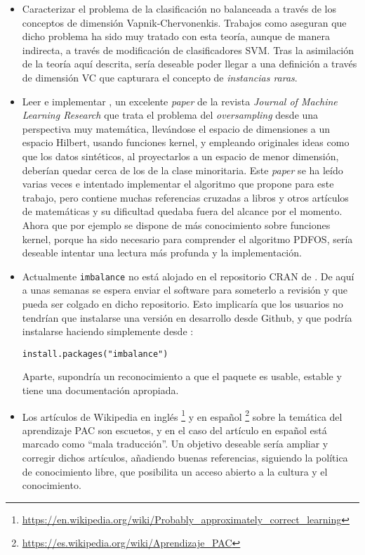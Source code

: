 \begin{itemize}
 \item Caracterizar el problema de la clasificación no balanceada a través de los conceptos de dimensión Vapnik-Chervonenkis.
  Trabajos como \citep{he2009} aseguran que dicho problema ha sido muy tratado con esta teoría, aunque de manera indirecta,
  a través de modificación de clasificadores SVM. Tras la asimilación de la teoría aquí descrita, sería deseable poder llegar
  a una definición a través de dimensión VC que capturara el concepto de \textit{instancias raras}.
  
 \item Leer e implementar \citep{pour2015}, un excelente \textit{paper} de la revista \textit{Journal of Machine Learning
  Research} que trata el problema del \textit{oversampling} desde una perspectiva muy matemática, llevándose el espacio
  de dimensiones a un espacio Hilbert, usando funciones kernel, y empleando originales ideas como que los datos sintéticos, al 
  proyectarlos a un espacio de menor dimensión, deberían quedar cerca de los de la clase minoritaria. Este \textit{paper} se ha 
  leído varias veces e intentado implementar el algoritmo que propone para este trabajo, pero contiene muchas referencias cruzadas a
  libros y otros artículos de matemáticas y su dificultad quedaba fuera del alcance por el momento. Ahora que por ejemplo
  se dispone de más conocimiento sobre funciones kernel, porque ha sido necesario para comprender el algoritmo PDFOS, sería
  deseable intentar una lectura más profunda y la implementación.
  
 \item Actualmente \texttt{imbalance} no está alojado en el repositorio CRAN de \R. De aquí a unas semanas se espera enviar
  el software para someterlo a revisión y que pueda ser colgado en dicho repositorio. Esto implicaría que los usuarios no
  tendrían que instalarse una versión en desarrollo desde Github, y que podría instalarse haciendo simplemente desde \R:
  \begin{lstlisting}[numbers=none]
   install.packages("imbalance")
  \end{lstlisting}
  Aparte, supondría un reconocimiento a que el paquete es usable, estable y tiene una documentación apropiada.
  
 \item Los artículos de Wikipedia en inglés \footnote{\url{https://en.wikipedia.org/wiki/Probably_approximately_correct_learning}} y en 
 español \footnote{\url{https://es.wikipedia.org/wiki/Aprendizaje_PAC}} sobre la temática del aprendizaje PAC son escuetos, y en el caso del 
 artículo en español está marcado como ``mala traducción''. Un objetivo deseable sería ampliar y corregir dichos artículos,
 añadiendo buenas referencias, siguiendo la política de conocimiento libre, que posibilita un acceso abierto a la cultura y
 el conocimiento.
\end{itemize}